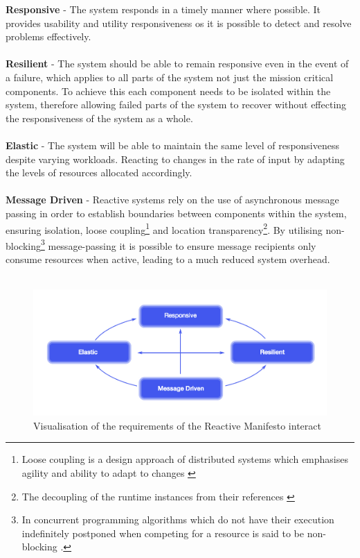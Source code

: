 \documentclass[a4paper, 11pt]{article}
\begin{document}
\textbf{Responsive} - The system responds in a timely manner where possible. It provides usability and utility responsiveness os it is possible to detect and resolve problems effectively.\\\\
\textbf{Resilient} - The system should be able to remain responsive even in the event of a failure, which applies to all parts of the system not just the mission critical components. To achieve this each component needs to be isolated within the system, therefore allowing failed parts of the system to recover without effecting the responsiveness of the system as a whole.\\\\
\textbf{Elastic} - The system will be able to maintain the same level of responsiveness despite varying workloads. Reacting to changes in the rate of input by adapting the levels of resources allocated accordingly.\\\\
\textbf{Message Driven} - Reactive systems rely on the use of asynchronous message passing in order to establish boundaries between components within the system, ensuring isolation, loose coupling\footnote{Loose coupling is a design approach of distributed systems which emphasises agility and ability to adapt to changes \cite{looseCouple}} and location transparency\footnote{The decoupling of the runtime instances from their references \cite{reactMan}}. By utilising non-blocking\footnote{In concurrent programming algorithms which do not have their execution indefinitely postponed when competing for a resource is said to be non-blocking \cite{reactMan}.} message-passing it is possible to ensure message recipients only consume resources when active, leading to a much reduced system overhead.\\\\

\begin{figure}[ht]
	\centering
	\includegraphics[scale=0.25]{images/reacManif.jpg}
	\caption{Visualisation of the requirements of the Reactive Manifesto interact \cite{reactMan}}
	\label{fig: reacMan}
\end{figure}
\end{document}
